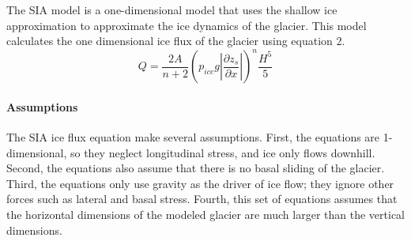 \documentclass{article}
\begin{document}
The SIA model is a one-dimensional model that uses the shallow ice approximation to approximate the ice dynamics of the glacier. This model 
calculates the one dimensional ice flux of the glacier using equation 2. 
\begin{equation}Q=\frac{2A}{n+2}(p_{ice}g|\frac{\partial z_s}{\partial x}|)^n\frac{H^5}{5}\end{equation}
\paragraph{Assumptions}

The SIA ice flux equation make several assumptions. First, the equations are 1-dimensional, so they neglect longitudinal stress, and ice only 
flows downhill. Second, the equations also assume that there is no basal sliding of the glacier. Third, the equations only use gravity as the 
driver of ice flow; they ignore other forces such as lateral and basal stress. Fourth, this set of equations assumes that the horizontal 
dimensions of the modeled glacier are much larger than the vertical dimensions.
\end{document}
